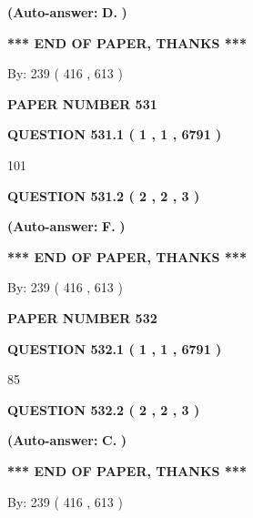 \documentclass{ctexart}
\begin{document}
 
{\textbf{(Auto-answer:}}
{\textbf{\large{
D.}}}
{\textbf{)}}
 
 
   
   
   
   
\vspace{1.0in} 
{\textbf{\large{ *** END OF PAPER, THANKS *** }}} 
   
   
\hspace{1.0in} By: 
 239 ( 416 ,  613 )
   
   
   
   
\newpage 
\setcounter{page}{ 
   531001 } 
   
   
 {\textbf{ \Large{ PAPER NUMBER  531  }}}
   
   
   
   
  
  
{\textbf{\large{QUESTION
531.1 
 ( 1 , 1 , 6791 )
}}}

101
  
  
{\textbf{\large{QUESTION
531.2 
 ( 2 , 2 , 3 )
}}}
 
 
{\textbf{(Auto-answer:}}
{\textbf{\large{
F.}}}
{\textbf{)}}
 
 
   
   
   
   
\vspace{1.0in} 
{\textbf{\large{ *** END OF PAPER, THANKS *** }}} 
   
   
\hspace{1.0in} By: 
 239 ( 416 ,  613 )
   
   
   
   
\newpage 
\setcounter{page}{ 
   532001 } 
   
   
 {\textbf{ \Large{ PAPER NUMBER  532  }}}
   
   
   
   
  
  
{\textbf{\large{QUESTION
532.1 
 ( 1 , 1 , 6791 )
}}}

85
  
  
{\textbf{\large{QUESTION
532.2 
 ( 2 , 2 , 3 )
}}}
 
 
{\textbf{(Auto-answer:}}
{\textbf{\large{
C.}}}
{\textbf{)}}
 
 
   
   
   
   
\vspace{1.0in} 
{\textbf{\large{ *** END OF PAPER, THANKS *** }}} 
   
   
\hspace{1.0in} By: 
 239 ( 416 ,  613 )
   
   
   
\end{document}
